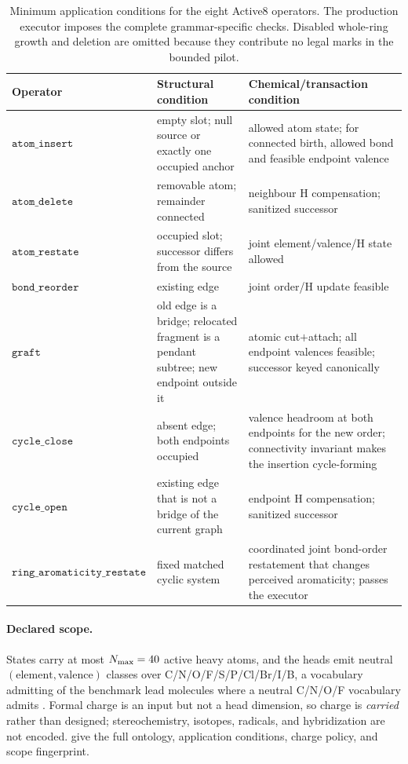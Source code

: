 \documentclass{article}
\newcommand{\op}[1]{\texttt{#1}}
\theoremstyle{definition}
\theoremstyle{remark}
\begin{document}
\begin{table}[h]
\centering
\caption{Minimum application conditions for the eight Active8 operators. The production executor imposes the complete grammar-specific checks. Disabled whole-ring growth and deletion are omitted because they contribute no legal marks in the bounded pilot.}
\small
\begin{tabularx}{\textwidth}{lX X}
\toprule
Operator & Structural condition & Chemical/transaction condition\\
\midrule
$\op{atom\_insert}$ & empty slot; null source or exactly one occupied anchor & allowed atom state; for connected birth, allowed bond and feasible endpoint valence\\
$\op{atom\_delete}$ & removable atom; remainder connected & neighbour H compensation; sanitized successor\\
$\op{atom\_restate}$ & occupied slot; successor differs from the source & joint element/valence/H state allowed\\
$\op{bond\_reorder}$ & existing edge & joint order/H update feasible\\
$\op{graft}$ & old edge is a bridge; relocated fragment is a pendant subtree; new endpoint outside it & atomic cut$+$attach; all endpoint valences feasible; successor keyed canonically\\
$\op{cycle\_close}$ & absent edge; both endpoints occupied & valence headroom at both endpoints for the new order; connectivity invariant makes the insertion cycle-forming\\
$\op{cycle\_open}$ & existing edge that is not a bridge of the current graph & endpoint H compensation; sanitized successor\\
$\op{ring\_aromaticity\_restate}$ & fixed matched cyclic system & coordinated joint bond-order restatement that changes perceived aromaticity; passes the executor\\
\bottomrule
\end{tabularx}
\end{table}

\paragraph{Declared scope.}
States carry at most $N_{\max}=40{}$ active heavy atoms, and the heads emit \ScopeClasses{} neutral $(\text{element},\text{valence})$ classes over C/N/O/F/S/P/Cl/Br/I/B, a vocabulary admitting \LeadCoverageBroad{} of the benchmark lead molecules where a neutral C/N/O/F vocabulary admits \LeadCoverageCnof{}. Formal charge is an input but not a head dimension, so charge is \emph{carried} rather than designed; stereochemistry, isotopes, radicals, and hybridization are not encoded.  give the full ontology, application conditions, charge policy, and scope fingerprint.
\end{document}
